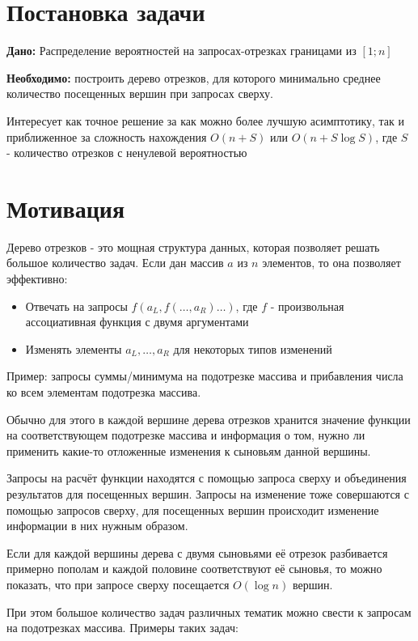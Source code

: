 \section{Постановка задачи}

\textbf{Дано:} Распределение вероятностей на запросах-отрезках границами из $[1; n]$

\textbf{Необходимо:} построить дерево отрезков, для которого минимально среднее
количество посещенных вершин при запросах сверху.

Интересует как точное решение за как можно более лучшую асимптотику, так и
приближенное за сложность нахождения $O(n + S)$ или $O(n + S \log S)$, где $S$ -
количество отрезков с ненулевой вероятностью

\section{Мотивация}

Дерево отрезков - это мощная структура данных, которая позволяет решать большое количество задач. 
Если дан массив $a$ из $n$ элементов, то она позволяет эффективно:

\begin{itemize}
    \item Отвечать на запросы $f(a_L, f(\dots, a_R)\dots)$, где $f$ - произвольная ассоциативная функция с двумя аргументами
    \item Изменять элементы $a_L,\dots,a_R$ для некоторых типов изменений
\end{itemize}

Пример: запросы суммы/минимума на подотрезке массива и прибавления числа ко всем элементам подотрезка массива.

Обычно для этого в каждой вершине дерева отрезков хранится значение функции на соответствующем подотрезке массива и информация о том, нужно ли применить какие-то отложенные изменения к сыновьям данной вершины.

Запросы на расчёт функции находятся с помощью запроса сверху и объединения результатов для посещенных вершин. Запросы на изменение тоже совершаются с помощью запросов сверху, для посещенных вершин происходит изменение информации в них нужным образом.

Если для каждой вершины дерева с двумя сыновьями её отрезок разбивается примерно пополам и каждой половине соответствуют её сыновья, то можно показать, что при запросе сверху посещается $O(\log n)$ вершин.

При этом большое количество задач различных тематик можно свести к запросам на подотрезках массива. Примеры таких задач:

